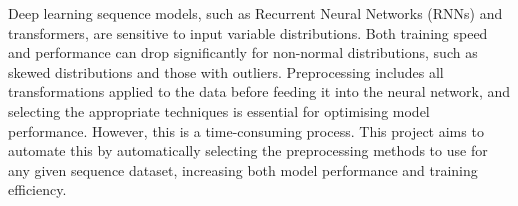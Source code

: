 \documentclass[portrait,final,x11names,a1paper,fontscale=0.4]{baposter}
\begin{document}
\begin{poster}
{\noindent   
Deep learning sequence models, such as Recurrent Neural Networks (RNNs) and
transformers, are sensitive to input variable distributions. Both training
speed and performance can drop significantly for non-normal distributions, such
as skewed distributions and those with outliers.
Preprocessing includes all transformations applied to the data before feeding it into
the neural network, and selecting the appropriate techniques is essential for
optimising model performance.
However, this is a time-consuming process. This project aims to automate this by
automatically selecting the preprocessing methods to use for any given
sequence dataset, increasing both model performance and training efficiency.
}





\end{poster}
\end{document}
